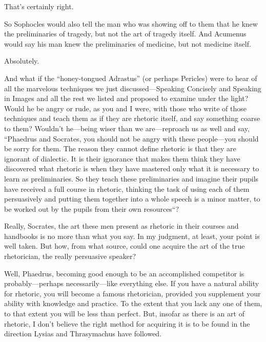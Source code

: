 \sayphaedrus That’s certainly right.

\saysocrates So Sophocles would also tell the man who was showing off 
to them that he knew the preliminaries of tragedy, but
not the art of tragedy itself. And Acumenus would say his man knew the
preliminaries of medicine, but not medicine itself.

\sayphaedrus Absolutely.

\saysocrates And what if the “honey-tongued Adrastus” (or perhaps
Pericles) were to hear
of all the marvelous techniques we just discussed---Speaking Concisely
and Speaking in Images and all the rest we listed and proposed
to examine under the light? Would he be angry or rude, as you and I
were, with those who write of those techniques and teach them as if they
are rhetoric itself, and say something coarse to them? Wouldn’t
he---being wiser than we are---reproach us as well and say, “Phaedrus
and Socrates, you should not be angry with these people---you should be
sorry for them. The reason they cannot define rhetoric is that they are
ignorant of dialectic. It is their ignorance that makes them think they
have discovered what rhetoric is when they have mastered only what it is necessary to learn as preliminaries. So they teach these
preliminaries and imagine their pupils have received a full course in
rhetoric, thinking the task of using each of them persuasively and
putting them together into a whole speech is a minor matter, to be
worked out by the pupils from their own resources“?

\sayphaedrus Really, Socrates, the art these men present as rhetoric in
their courses and handbooks is no more than what you say. In my
judgment, at least, your point is well taken. But how, from what
source, could one acquire the art of the true rhetorician, the really
persuasive speaker?

\saysocrates Well, Phaedrus, becoming good enough to be an accomplished
competitor is probably---perhaps necessarily---like everything else. If
you have a natural ability for rhetoric, you will become a famous
rhetorician, provided you supplement your ability with knowledge and
practice. To the extent that you lack any one of them, to that extent
you will be less than perfect. But, insofar as there is an art of
rhetoric, I don’t believe the right method for acquiring it is to be
found in the direction Lysias and Thrasymachus have followed.

